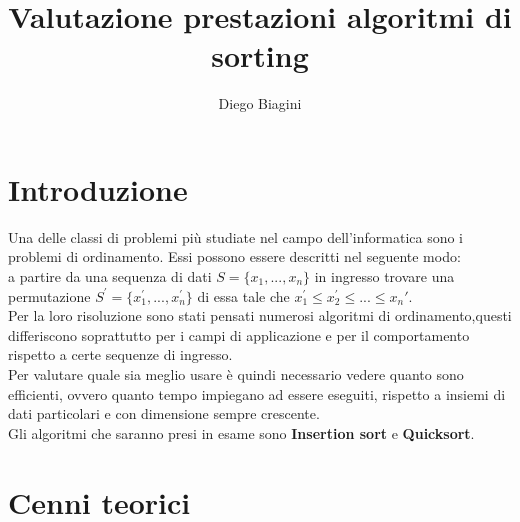 \documentclass[]{article}
\author{Diego Biagini}
\title{Valutazione prestazioni algoritmi di sorting}
\begin{document}
\maketitle
\newpage
\section{Introduzione}
Una delle classi di problemi più studiate nel campo dell'informatica sono i problemi di ordinamento.
Essi possono essere descritti nel seguente modo:\\ a partire da una sequenza di dati 
$S = \{x_1, ... , x_n\}$ in ingresso trovare una permutazione $S^{\prime} = \{x_1^{\prime}, ... , x_n^{\prime}\}$ di essa tale che $x_1^{\prime} \leq x_2^{\prime} \leq ... \leq x_n{\prime}$.\\
Per la loro risoluzione sono stati pensati numerosi algoritmi di ordinamento,questi differiscono soprattutto per i campi di applicazione e per il comportamento rispetto a certe sequenze di ingresso.\\
Per valutare quale sia meglio usare è quindi necessario vedere quanto sono efficienti, ovvero quanto tempo impiegano ad essere eseguiti, rispetto a insiemi di dati particolari e con dimensione sempre crescente.\\
Gli algoritmi che saranno presi in esame sono \textbf{Insertion sort} e \textbf{Quicksort}.


\section{Cenni teorici}
\end{document}

